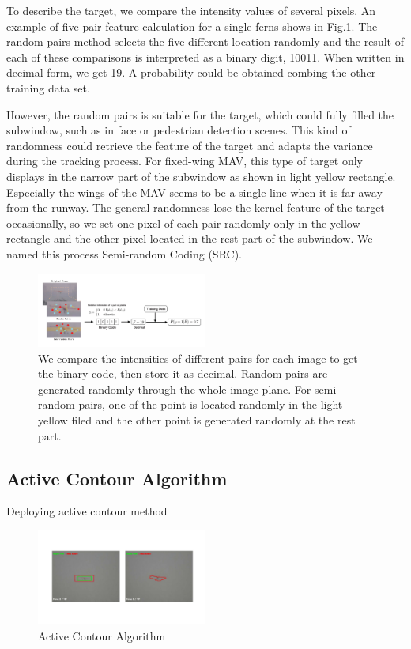 To describe the target, we compare the intensity values of several pixels.  An example of five-pair feature calculation for a single ferns shows in Fig.\ref{fig:01_TLD_Code}. The random pairs method selects the five different location randomly and the result of each of these comparisons is interpreted as a binary digit, 10011. When written in decimal form, we get 19. A probability could be obtained combing the other training data set.

However, the random pairs is suitable for the target, which could fully filled the subwindow, such as in face or pedestrian detection scenes. This kind of randomness could retrieve the feature of the target and adapts the variance during the tracking process. For fixed-wing MAV, this type of target only displays in the narrow part of the subwindow as shown in light yellow rectangle. Especially the wings of the MAV seems to be a single line when it is far away from the runway. The general randomness lose the kernel feature of the target occasionally, so we set one pixel of each pair randomly only in the yellow rectangle and the other pixel located in the rest part of the subwindow.  We named this process Semi-random Coding (SRC). 

\begin{figure}[!th]
	\centering
	\includegraphics[width=0.5\textwidth]{Figs/01_TLD_Code.pdf}
	\caption{ We compare the intensities of different pairs for each image to get the binary code, then store it as decimal. Random pairs are generated randomly through the whole image plane. For semi-random pairs, one of the point is located randomly in the light yellow ﬁled and the other point is generated randomly at the rest part.}
	\label{fig:01_TLD_Code}    
\end{figure}


\subsection{Active Contour Algorithm}

Deploying active contour method
\begin{figure}[!th]
	\centering
	\includegraphics[width=0.5\textwidth]{Figs/chp04_07_active_contour_demo.pdf}
	\caption{Active Contour Algorithm}
	\label{fig:chp04_07_active_contour_demo}    
\end{figure}


